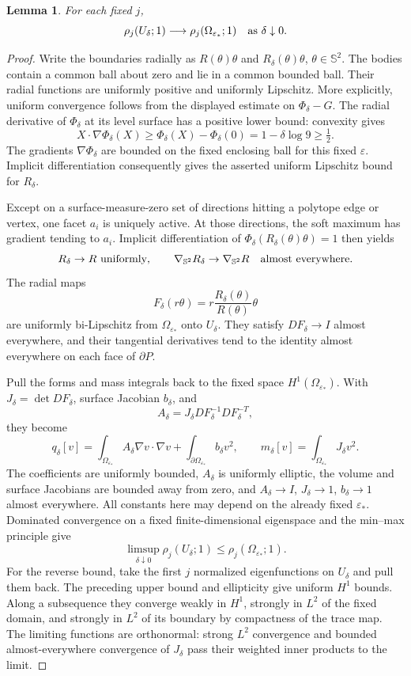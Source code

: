 \documentclass[11pt,a4paper]{article}
\newtheorem{lemma}[theorem]{Lemma}
\theoremstyle{remark}
\newcommand{\eps}{\varepsilon}
\begin{document}
\begin{lemma}\label{lem:smoothing-spectrum}
For each fixed $j$,
\[
 \rho_j(U_\delta;1)\longrightarrow\rho_j(\Omega_{\eps_*};1)
 \quad\hbox{as }\delta\downarrow0.
\]
\end{lemma}
\begin{proof}
Write the boundaries radially as $R(\theta)\theta$ and $R_\delta(\theta)\theta$, $\theta\in\mathbb S^2$. The bodies contain a common ball about zero and lie in a common bounded ball. Their radial functions are uniformly positive and uniformly Lipschitz. More explicitly, uniform convergence follows from the displayed estimate on $\Phi_\delta-G$. The radial derivative of $\Phi_\delta$ at its level surface has a positive lower bound: convexity gives
\[
 X\cdot\nabla\Phi_\delta(X)\ge\Phi_\delta(X)-\Phi_\delta(0)
 =1-\delta\log9\ge\tfrac12.
\]
The gradients $\nabla\Phi_\delta$ are bounded on the fixed enclosing ball for this fixed $\eps$. Implicit differentiation consequently gives the asserted uniform Lipschitz bound for $R_\delta$.

Except on a surface-measure-zero set of directions hitting a polytope edge or vertex, one facet $a_i$ is uniquely active. At those directions, the soft maximum has gradient tending to $a_i$. Implicit differentiation of
$\Phi_\delta(R_\delta(\theta)\theta)=1$ then yields
\[
 R_\delta\to R\ \hbox{uniformly},\qquad
 \nabla_{\mathbb S^2}R_\delta\to\nabla_{\mathbb S^2}R
 \quad\hbox{almost everywhere}.
\]
The radial maps
\[
 F_\delta(r\theta)=r\frac{R_\delta(\theta)}{R(\theta)}\theta
\]
are uniformly bi-Lipschitz from $\Omega_{\eps_*}$ onto $U_\delta$. They satisfy $DF_\delta\to I$ almost everywhere, and their tangential derivatives tend to the identity almost everywhere on each face of $\partial P$.

Pull the forms and mass integrals back to the fixed space $H^1(\Omega_{\eps_*})$. With $J_\delta=\det DF_\delta$, surface Jacobian $b_\delta$, and
\[
 A_\delta=J_\delta DF_\delta^{-1}DF_\delta^{-T},
\]
they become
\[
 q_\delta[v]=\int_{\Omega_{\eps_*}}A_\delta\nabla v\cdot\nabla v
     +\int_{\partial\Omega_{\eps_*}}b_\delta v^2,
 \qquad m_\delta[v]=\int_{\Omega_{\eps_*}}J_\delta v^2.
\]
The coefficients are uniformly bounded, $A_\delta$ is uniformly elliptic, the volume and surface Jacobians are bounded away from zero, and
$A_\delta\to I$, $J_\delta\to1$, $b_\delta\to1$ almost everywhere. All constants here may depend on the already fixed $\eps_*$. Dominated convergence on a fixed finite-dimensional eigenspace and the min--max principle give
\[
 \limsup_{\delta\downarrow0}\rho_j(U_\delta;1)
 \le\rho_j(\Omega_{\eps_*};1).
\]
For the reverse bound, take the first $j$ normalized eigenfunctions on $U_\delta$ and pull them back. The preceding upper bound and ellipticity give uniform $H^1$ bounds. Along a subsequence they converge weakly in $H^1$, strongly in $L^2$ of the fixed domain, and strongly in $L^2$ of its boundary by compactness of the trace map. The limiting functions are orthonormal: strong $L^2$ convergence and bounded almost-everywhere convergence of $J_\delta$ pass their weighted inner products to the limit.


\end{proof}
\end{document}

